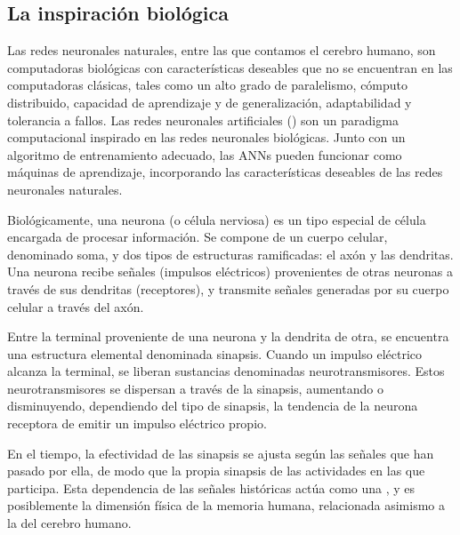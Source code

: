 %
%
\subsection{La inspiración biológica}
%
Las redes neuronales naturales, entre las que contamos el cerebro
humano, son computadoras biológicas con características deseables que
no se encuentran en las computadoras clásicas, tales como un alto
grado de paralelismo, cómputo distribuido, capacidad de aprendizaje y
de generalización, adaptabilidad y tolerancia a fallos.
Las redes neuronales artificiales () son un paradigma computacional inspirado en las redes
neuronales biológicas.
Junto con un algoritmo de entrenamiento adecuado, las ANNs pueden
funcionar como máquinas de aprendizaje, incorporando las
características deseables de las redes neuronales naturales.

Biológicamente, una neurona (o célula nerviosa) es un tipo especial de
célula encargada de procesar información.
Se compone de un cuerpo celular, denominado {soma}, y dos tipos de
estructuras ramificadas: el axón y las dendritas.
Una neurona recibe señales (impulsos eléctricos) provenientes de otras
neuronas a través de sus dendritas (receptores), y transmite señales
generadas por su cuerpo celular a través del axón.

Entre la terminal proveniente de una neurona y la dendrita de otra, se
encuentra una estructura elemental denominada sinapsis.
Cuando un impulso eléctrico alcanza la terminal, se liberan sustancias
denominadas neurotransmisores.
Estos neurotransmisores se dispersan a través de la sinapsis,
aumentando o disminuyendo, dependiendo del tipo de sinapsis, la
tendencia de la neurona receptora de emitir un impulso eléctrico
propio.

En el tiempo, la efectividad de las sinapsis se ajusta según las
señales que han pasado por ella, de modo que la propia sinapsis
 de las actividades en las que participa.
Esta dependencia de las señales históricas actúa como una ,
y es posiblemente la dimensión física de la memoria humana,
relacionada asimismo a la  del cerebro
humano.
